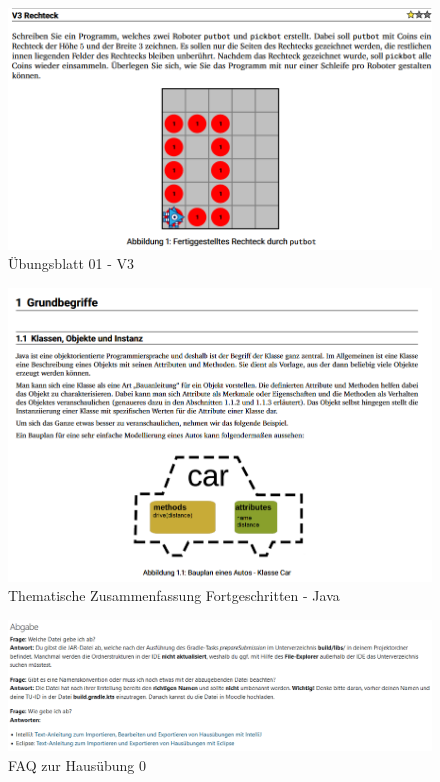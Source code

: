 \documentclass{../tuda-beamer}
\begin{document}
  \begin{frame}[c]
    \begin{figure}[h]
      \centering
      \includegraphics[width=.7\linewidth]{graphics/cp_exercise_example.png}
      \caption{Übungsblatt 01 - V3}
    \end{figure}
  \end{frame}

  \begin{frame}[c]
    \begin{figure}[h]
      \centering
      \includegraphics[width=.6\linewidth]{graphics/cp_summary_example.png}
      \caption{Thematische Zusammenfassung Fortgeschritten - Java}
    \end{figure}
  \end{frame}

  \begin{frame}[c]
    \begin{figure}[h]
      \centering
      \includegraphics[width=.985\linewidth]{graphics/faq_example.png}
      \caption{FAQ zur Hausübung 0}
    \end{figure}
  \end{frame}
\end{document}
